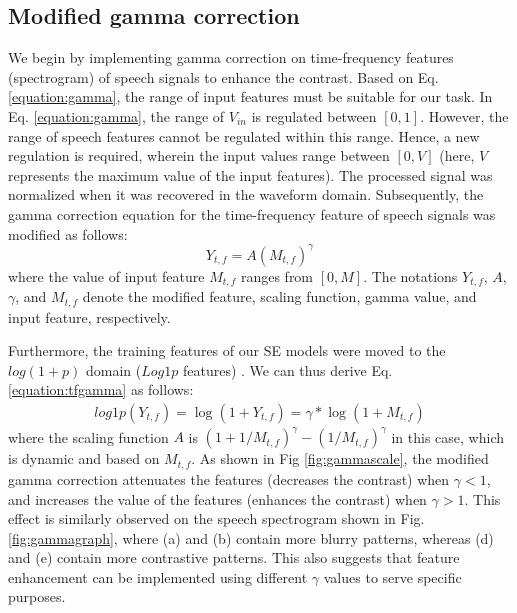 \documentclass[a4paper]{article}
\begin{document}
\subsection{Modified gamma correction}
We begin by implementing gamma correction on time-frequency features (spectrogram) of speech signals to enhance the contrast.
Based on Eq. \ref{equation:gamma}, the range of input features must be suitable for our task. In Eq. \ref{equation:gamma}, the range of $V_{in}$ is regulated between $[0, 1]$. However, the range of speech features cannot be regulated within this range. Hence, a new regulation is required, wherein the input values range between $[0, V]$ (here, $V$ represents the maximum value of the input features). The processed signal was normalized when it was recovered in the waveform domain. Subsequently, the gamma correction equation for the time-frequency feature of speech signals was modified as follows:
\begin{equation}
\label{equation:tfgamma}
Y_{t,f} = A(M_{t,f})^\gamma
\end{equation}
where the value of input feature $M_{t,f}$ ranges from $[0, M]$. The notations $Y_{t,f}$, $A$, $\gamma$, and $M_{t,f}$ denote the modified feature, scaling function, gamma value, and input feature, respectively.




Furthermore, the training features of our SE models were moved to the $log(1 + p)$ domain ($Log1p$ features) \cite{fu2020boosting}. We can thus derive Eq. \ref{equation:tfgamma} as follows:
\begin{equation}
\label{equation:log1pgamma}
\begin{aligned}
    log1p(Y_{t,f}) = \log (1+Y_{t,f}) = \gamma * \log (1+M_{t,f})
\end{aligned} 
\end{equation}
where the scaling function $A$ is $(1+1/M_{t,f})^{\gamma} - (1/M_{t,f})^{\gamma}$ in this case, which is dynamic and based on $M_{t,f}$. As shown in Fig \ref{fig:gammascale}, the modified gamma correction attenuates the features (decreases the contrast) when $\gamma < 1$, and increases the value of the features (enhances the contrast) when $\gamma > 1$. This effect is similarly observed on the speech spectrogram shown in Fig. \ref{fig:gammagraph}, where (a) and (b) contain more blurry patterns, whereas (d) and (e) contain more contrastive patterns. This also suggests that feature enhancement can be implemented using different $\gamma$ values to serve specific purposes. 
\end{document}
